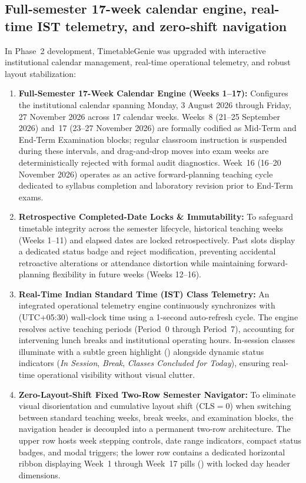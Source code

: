 \documentclass[pdflatex,sn-mathphys-num]{sn-jnl}
\theoremstyle{thmstyleone}
\theoremstyle{thmstyletwo}
\theoremstyle{thmstylethree}
\newcommand{\code}[1]{\texttt{\small\detokenize{#1}}}
\begin{document}
\subsection{Full-semester 17-week calendar engine, real-time IST telemetry, and zero-shift navigation}

In Phase~2 development, TimetableGenie was upgraded with interactive institutional calendar management, real-time operational telemetry, and robust layout stabilization:
\begin{enumerate}
\item \textbf{Full-Semester 17-Week Calendar Engine (Weeks 1--17):} Configures the institutional calendar spanning Monday, 3 August 2026 through Friday, 27 November 2026 across 17 calendar weeks. Weeks~8 (21--25 September 2026) and~17 (23--27 November 2026) are formally codified as Mid-Term and End-Term Examination blocks; regular classroom instruction is suspended during these intervals, and drag-and-drop moves into exam weeks are deterministically rejected with formal audit diagnostics. Week~16 (16--20 November 2026) operates as an active forward-planning teaching cycle dedicated to syllabus completion and laboratory revision prior to End-Term exams.
\item \textbf{Retrospective Completed-Date Locks \& Immutability:} To safeguard timetable integrity across the semester lifecycle, historical teaching weeks (Weeks 1--11) and elapsed dates are locked retrospectively. Past slots display a dedicated \code{Completed} status badge and reject modification, preventing accidental retroactive alterations or attendance distortion while maintaining forward-planning flexibility in future weeks (Weeks 12--16).
\item \textbf{Real-Time Indian Standard Time (IST) Class Telemetry:} An integrated operational telemetry engine continuously synchronizes with \code{Asia/Kolkata} (UTC+05:30) wall-clock time using a 1-second auto-refresh cycle. The engine resolves active teaching periods (Period~0 through Period~7), accounting for intervening lunch breaks and institutional operating hours. In-session classes illuminate with a subtle green highlight (\code{live-running}) alongside dynamic status indicators (\emph{In Session}, \emph{Break}, \emph{Classes Concluded for Today}), ensuring real-time operational visibility without visual clutter.
\item \textbf{Zero-Layout-Shift Fixed Two-Row Semester Navigator:} To eliminate visual disorientation and cumulative layout shift ($\text{CLS}=0$) when switching between standard teaching weeks, break weeks, and examination blocks, the navigation header is decoupled into a permanent two-row architecture. The upper row hosts week stepping controls, date range indicators, compact status badges, and modal triggers; the lower row contains a dedicated horizontal ribbon displaying Week~1 through Week~17 pills (\code{.week-strip-scroll}) with locked day header dimensions.

\end{enumerate}
\end{document}
